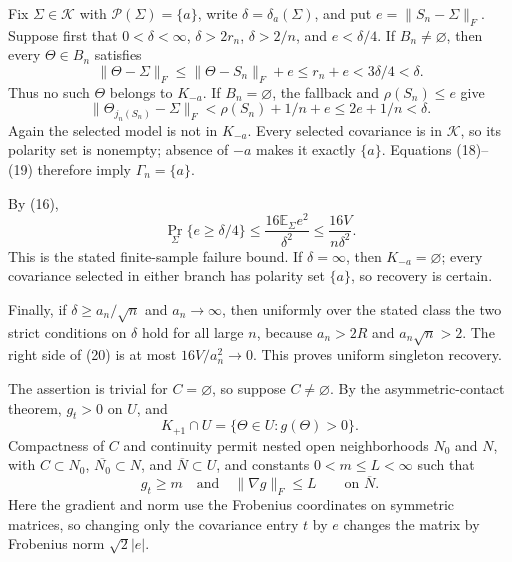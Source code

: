 Fix \(\Sigma\in\mathcal K\) with \(\mathcal P(\Sigma)=\{a\}\), write \(\delta=\delta_a(\Sigma)\), and put \(e=\lVert S_n-\Sigma\rVert_F\).  Suppose first that \(0<\delta<\infty\), \(\delta>2r_n\), \(\delta>2/n\), and \(e<\delta/4\).  If \(B_n\ne\varnothing\), then every \(\Theta\in B_n\) satisfies
\[
 \lVert\Theta-\Sigma\rVert_F
 \le\lVert\Theta-S_n\rVert_F+e
 \le r_n+e<3\delta/4<\delta. \tag{18}
\]
Thus no such \(\Theta\) belongs to \(K_{-a}\).  If \(B_n=\varnothing\), the fallback and \(\rho(S_n)\le e\) give
\[
 \lVert\Theta_{j_n(S_n)}-\Sigma\rVert_F
 <\rho(S_n)+1/n+e\le2e+1/n<\delta. \tag{19}
\]
Again the selected model is not in \(K_{-a}\).  Every selected covariance is in \(\mathcal K\), so its polarity set is nonempty; absence of \(-a\) makes it exactly \(\{a\}\).  Equations (18)--(19) therefore imply \(\Gamma_n=\{a\}\).

By (16),
\[
 \Pr_{\Sigma}\{e\ge\delta/4\}
 \le\frac{16\mathbb E_{\Sigma}e^2}{\delta^2}
 \le\frac{16V}{n\delta^2}. \tag{20}
\]
This is the stated finite-sample failure bound.  If \(\delta=\infty\), then \(K_{-a}=\varnothing\); every covariance selected in either branch has polarity set \(\{a\}\), so recovery is certain.

Finally, if \(\delta\ge a_n/\sqrt n\) and \(a_n\to\infty\), then uniformly over the stated class the two strict conditions on \(\delta\) hold for all large \(n\), because \(a_n>2R\) and \(a_n\sqrt n>2\).  The right side of (20) is at most \(16V/a_n^2\to0\).  This proves uniform singleton recovery.

The assertion is trivial for \(C=\varnothing\), so suppose \(C\ne\varnothing\).  By the asymmetric-contact theorem, \(g_t>0\) on \(U\), and
\[
 K_{+1}\cap U=\{\Theta\in U:g(\Theta)>0\}. \tag{21}
\]
Compactness of \(C\) and continuity permit nested open neighborhoods \(N_0\) and \(N\), with \(C\subset N_0\), \(\overline{N_0}\subset N\), and \(\overline N\subset U\), and constants \(0<m\le L<\infty\) such that
\[
 g_t\ge m\quad\text{and}\quad \lVert\nabla g\rVert_F\le L
 \qquad\text{on }\overline N. \tag{22}
\]
Here the gradient and norm use the Frobenius coordinates on symmetric matrices, so changing only the covariance entry \(t\) by \(e\) changes the matrix by Frobenius norm \(\sqrt2|e|\).

